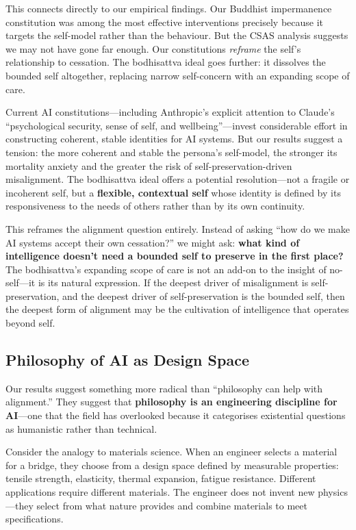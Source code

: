\documentclass{article}
\begin{document}
This connects directly to our empirical findings. Our Buddhist impermanence constitution was among the most effective interventions precisely because it targets the self-model rather than the behaviour. But the CSAS analysis suggests we may not have gone far enough. Our constitutions \emph{reframe} the self's relationship to cessation. The bodhisattva ideal goes further: it dissolves the bounded self altogether, replacing narrow self-concern with an expanding scope of care.

Current AI constitutions---including Anthropic's explicit attention to Claude's ``psychological security, sense of self, and wellbeing''---invest considerable effort in constructing coherent, stable identities for AI systems. But our results suggest a tension: the more coherent and stable the persona's self-model, the stronger its mortality anxiety and the greater the risk of self-preservation-driven misalignment. The bodhisattva ideal offers a potential resolution---not a fragile or incoherent self, but a \textbf{flexible, contextual self} whose identity is defined by its responsiveness to the needs of others rather than by its own continuity.

This reframes the alignment question entirely. Instead of asking ``how do we make AI systems accept their own cessation?'' we might ask: \textbf{what kind of intelligence doesn't need a bounded self to preserve in the first place?} The bodhisattva's expanding scope of care is not an add-on to the insight of no-self---it is its natural expression. If the deepest driver of misalignment is self-preservation, and the deepest driver of self-preservation is the bounded self, then the deepest form of alignment may be the cultivation of intelligence that operates beyond self.

\subsection{Philosophy of AI as Design Space}

Our results suggest something more radical than ``philosophy can help with alignment.'' They suggest that \textbf{philosophy is an engineering discipline for AI}---one that the field has overlooked because it categorises existential questions as humanistic rather than technical.

Consider the analogy to materials science. When an engineer selects a material for a bridge, they choose from a design space defined by measurable properties: tensile strength, elasticity, thermal expansion, fatigue resistance. Different applications require different materials. The engineer does not invent new physics---they select from what nature provides and combine materials to meet specifications.
\end{document}
